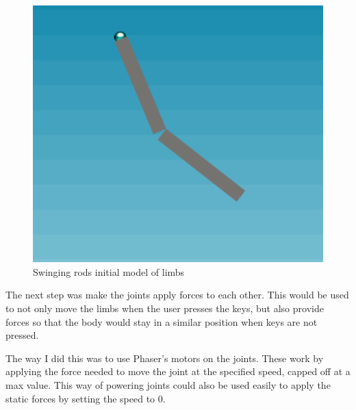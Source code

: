 \documentclass[12pt,a4paper,twoside,openright]{report}
\begin{document}
\begin{figure}[tbh]
\centerline{\includegraphics[scale=0.5]{swingingRods.PNG}}
\caption{Swinging rods initial model of limbs}
\label{swingingRods}
\end{figure}

The next step was make the joints apply forces to each other. This would be used to not only move the limbs when the user presses the keys, but also provide forces so that the body would stay in a similar position when keys are not pressed.

The way I did this was to use Phaser's motors on the joints. These work by applying the force needed to move the joint at the specified speed, capped off at a max value. This way of powering joints could also be used easily to apply the static forces by setting the speed to 0.





\end{document}
